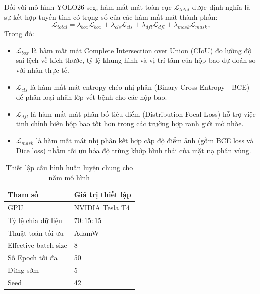 Đối với mô hình YOLO26-seg, hàm mất mát toàn cục $\mathcal{L}_{total}$ được định nghĩa là sự kết hợp tuyến tính có trọng số của các hàm mất mát thành phần:
\begin{equation}
\mathcal{L}_{total} = \lambda_{box} \mathcal{L}_{box} + \lambda_{cls} \mathcal{L}_{cls} + \lambda_{dfl} \mathcal{L}_{dfl} + \lambda_{mask} \mathcal{L}_{mask},
\end{equation}
Trong đó:
\begin{itemize}
  \item $\mathcal{L}_{box}$ là hàm mất mát Complete Intersection over Union (CIoU) đo lường độ sai lệch về kích thước, tỷ lệ khung hình và vị trí tâm của hộp bao dự đoán so với nhãn thực tế.
  \item $\mathcal{L}_{cls}$ là hàm mất mát entropy chéo nhị phân (Binary Cross Entropy - BCE) để phân loại nhãn lớp vết bệnh cho các hộp bao.
  \item $\mathcal{L}_{dfl}$ là hàm mất mát phân bố tiêu điểm (Distribution Focal Loss) hỗ trợ việc tinh chỉnh biên hộp bao tốt hơn trong các trường hợp ranh giới mờ nhòe.
  \item $\mathcal{L}_{mask}$ là hàm mất mát nhị phân kết hợp cấp độ điểm ảnh (gồm BCE loss và Dice loss) nhằm tối ưu hóa độ trùng khớp hình thái của mặt nạ phân vùng.
\end{itemize}

\begin{table}[htbp]
    \centering
    \caption{Thiết lập cấu hình huấn luyện chung cho năm mô hình}
    \label{tab:common_train_config}
    \begin{tabular}{ll}
        \toprule
        \textbf{Tham số}              & \textbf{Giá trị thiết lập} \\
        \midrule
        GPU                  & NVIDIA Tesla T4   \\
        Tỷ lệ chia dữ liệu   & $70:15:15$        \\
        Thuật toán tối ưu    & AdamW             \\
        Effective batch size & 8                 \\
        Số Epoch tối đa      & 50                \\
        Dừng sớm             & 5                 \\
        Seed                 & 42                \\
        \bottomrule
    \end{tabular}
\end{table}

